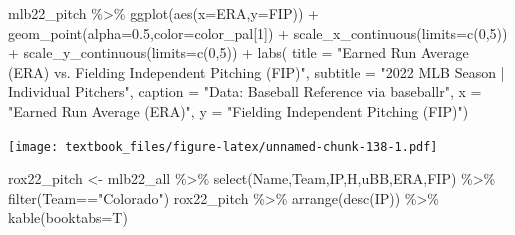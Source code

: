 \documentclass[
  11pt,
]{book}
\newenvironment{Shaded}{\begin{snugshade}}{\end{snugshade}}
\newcommand{\AttributeTok}[1]{\textcolor[rgb]{0.77,0.63,0.00}{#1}}
\newcommand{\DecValTok}[1]{\textcolor[rgb]{0.00,0.00,0.81}{#1}}
\newcommand{\FloatTok}[1]{\textcolor[rgb]{0.00,0.00,0.81}{#1}}
\newcommand{\FunctionTok}[1]{\textcolor[rgb]{0.00,0.00,0.00}{#1}}
\newcommand{\NormalTok}[1]{#1}
\newcommand{\OtherTok}[1]{\textcolor[rgb]{0.56,0.35,0.01}{#1}}
\newcommand{\SpecialCharTok}[1]{\textcolor[rgb]{0.00,0.00,0.00}{#1}}
\newcommand{\StringTok}[1]{\textcolor[rgb]{0.31,0.60,0.02}{#1}}
\theoremstyle{definition}
\theoremstyle{definition}
\theoremstyle{definition}
\theoremstyle{definition}
\theoremstyle{remark}
\begin{document}
\newpage

\begin{Shaded}
\begin{Highlighting}[]
\NormalTok{mlb22\_pitch }\SpecialCharTok{\%\textgreater{}\%} 
  \FunctionTok{ggplot}\NormalTok{(}\FunctionTok{aes}\NormalTok{(}\AttributeTok{x=}\NormalTok{ERA,}\AttributeTok{y=}\NormalTok{FIP)) }\SpecialCharTok{+}
  \FunctionTok{geom\_point}\NormalTok{(}\AttributeTok{alpha=}\FloatTok{0.5}\NormalTok{,}\AttributeTok{color=}\NormalTok{color\_pal[}\DecValTok{1}\NormalTok{]) }\SpecialCharTok{+}
  \FunctionTok{scale\_x\_continuous}\NormalTok{(}\AttributeTok{limits=}\FunctionTok{c}\NormalTok{(}\DecValTok{0}\NormalTok{,}\DecValTok{5}\NormalTok{)) }\SpecialCharTok{+}
  \FunctionTok{scale\_y\_continuous}\NormalTok{(}\AttributeTok{limits=}\FunctionTok{c}\NormalTok{(}\DecValTok{0}\NormalTok{,}\DecValTok{5}\NormalTok{)) }\SpecialCharTok{+}
  \FunctionTok{labs}\NormalTok{(}
    \AttributeTok{title =} \StringTok{"Earned Run Average (ERA) vs. Fielding Independent Pitching (FIP)"}\NormalTok{,}
    \AttributeTok{subtitle =} \StringTok{"2022 MLB Season | Individual Pitchers"}\NormalTok{,}
    \AttributeTok{caption =} \StringTok{"Data: Baseball Reference via baseballr"}\NormalTok{, }
    \AttributeTok{x =} \StringTok{"Earned Run Average (ERA)"}\NormalTok{,}
    \AttributeTok{y =} \StringTok{"Fielding Independent Pitching (FIP)"}\NormalTok{)}
\end{Highlighting}
\end{Shaded}

\texttt{[image: textbook\_files/figure-latex/unnamed-chunk-138-1.pdf]}

\newpage

\begin{Shaded}
\begin{Highlighting}[]
\NormalTok{rox22\_pitch }\OtherTok{\textless{}{-}}\NormalTok{ mlb22\_all }\SpecialCharTok{\%\textgreater{}\%} 
  \FunctionTok{select}\NormalTok{(Name,Team,IP,H,uBB,ERA,FIP) }\SpecialCharTok{\%\textgreater{}\%} 
  \FunctionTok{filter}\NormalTok{(Team}\SpecialCharTok{==}\StringTok{"Colorado"}\NormalTok{)}
\NormalTok{rox22\_pitch }\SpecialCharTok{\%\textgreater{}\%} 
  \FunctionTok{arrange}\NormalTok{(}\FunctionTok{desc}\NormalTok{(IP)) }\SpecialCharTok{\%\textgreater{}\%} 
  \FunctionTok{kable}\NormalTok{(}\AttributeTok{booktabs=}\NormalTok{T)}
\end{Highlighting}
\end{Shaded}
\end{document}
